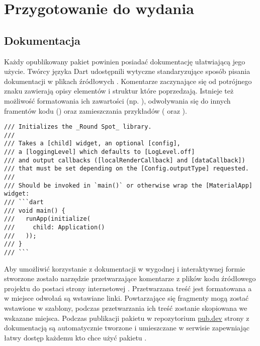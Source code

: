 \section{Przygotowanie do wydania}

\subsection{Dokumentacja}
Każdy opublikowany pakiet powinien posiadać dokumentację ułatwiającą jego użycie. Twórcy języka Dart udostępnili wytyczne standaryzujące sposób pisania dokumentacji w plikach źródłowych \cite{Dart_Doc_Guidelines}. Komentarze zaczynające się od potrójnego znaku \codeinline{///} zawierają opisy elementów i struktur które poprzedzają. Istnieje też możliwość formatowania ich zawartości (np. ), odwoływania się do innych framentów kodu () oraz zamieszczania przykładów ( oraz ).

\begin{lstlisting}[language=dartcomment,caption={Fragment dokumentacji zawartej w kodzie źródłowym pakietu},label=lst:rs_docs]
/// Initializes the _Round Spot_ library.
///
/// Takes a [child] widget, an optional [config],
/// a [loggingLevel] which defaults to [LogLevel.off]
/// and output callbacks ([localRenderCallback] and [dataCallback]) 
/// that must be set depending on the [Config.outputType] requested.
///
/// Should be invoked in `main()` or otherwise wrap the [MaterialApp] widget:
/// ```dart
/// void main() {
///   runApp(initialize(
///     child: Application()
///   ));
/// }
/// ```
\end{lstlisting}

Aby umożliwić korzystanie z dokumentacji w wygodnej i interaktywnej formie stworzone zostało narzędzie  przetwarzające komentarze z plików kodu źródłowego projektu do postaci strony internetowej \cite{Dart_Doc}. Przetwarzana treść jest formatowana a w miejsce odwołań są wstawiane linki. Powtarzające się fragmenty mogą zostać wstawione w szablony, podczas przetwarzania ich treść zostanie skopiowana we wskazane miejsca. Podczas publikacji pakietu w repozytorium \href{https://pub.dev/}{pub.dev} strony z dokumentacją są automatycznie tworzone i umieszczane w serwisie zapewniając łatwy dostęp każdemu kto chce użyć pakietu \cite{RS_Documentation}.


